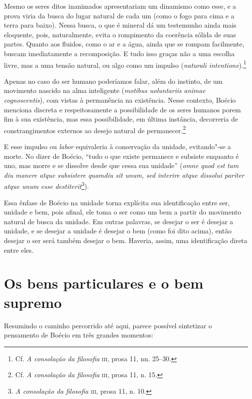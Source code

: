 Mesmo os seres ditos inanimados apresentariam um dinamismo como
esse, e a prova viria da busca do lugar natural de cada um (como
o fogo para cima e a terra para baixo). Nessa busca, o que é
mineral dá um testemunho ainda mais eloquente, pois,
naturalmente, evita o rompimento da coerência sólida de suas
partes. Quanto aos fluidos, como o ar e a água, ainda que se
rompam facilmente, buscam imediatamente a recomposição. E tudo
isso graças não a uma escolha livre, mas a uma tensão natural,
ou algo como um impulso (\emph{naturali intentione}).\footnote{
Cf. \emph{A consolação da filosofia} \textsc{iii}, prosa 11, nn.
25--30.}

Apenas no caso do ser humano poderíamos falar, além do instinto,
de um movimento nascido na alma inteligente (\emph{motibus
uoluntariis animae cognoscentis}), com vistas à permanência na
existência. Nesse contexto, Boécio menciona discreta e
respeitosamente a possibilidade de os seres humanos porem fim à
sua existência, mas essa possibilidade, em última instância,
decorreria de constrangimentos externos ao desejo natural de
permanecer.\footnote{ Cf. \emph{A consolação da filosofia}
\textsc{iii},
prosa 11, n. 15.}

E esse impulso ou \emph{labor} equivaleria à conservação da
unidade, evitando"-se a morte. No dizer de Boécio, “tudo o que
existe permanece e subsiste enquanto é uno, mas morre e se
dissolve desde que cessa sua unidade” (\emph{omne quod est tam
diu manere atque subsistere  quamdiu sit unum, sed interire
atque dissolui pariter atque unum esse destiterit}\footnote{
\emph{A consolação da filosofia} \textsc{iii}, prosa 11, n. 10.}).

Essa ênfase de Boécio na unidade torna explícita sua
identificação entre ser, unidade e bem, pois afinal, ele toma o ser
como um bem a partir do movimento natural de busca da unidade.
Em outras palavras, se desejar o ser é desejar a unidade, e se
desejar a unidade é desejar o bem (como foi dito acima), então
desejar o ser será também desejar o bem. Haveria, assim, uma
identificação direta entre eles.

\section{Os bens particulares e o bem supremo}

Resumindo o caminho percorrido até aqui, parece possível
sintetizar o pensamento de Boécio em três grandes momentos:

